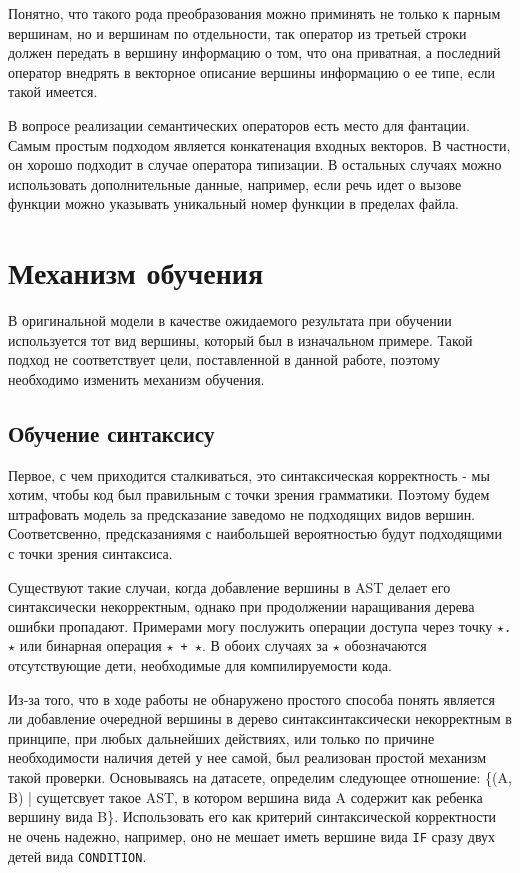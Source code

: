 \documentclass[times,specification,annotation]{itmo-student-thesis}
\begin{document}
Понятно, что такого рода преобразования можно приминять не только к парным вершинам, но и вершинам по отдельности, так оператор из третьей строки должен передать в вершину информацию о том, что она приватная, а последний оператор внедрять в векторное описание вершины информацию о ее типе, если такой имеется.

В вопросе реализации семантических операторов есть место для фантации. Самым простым подходом является конкатенация входных векторов. В частности, он хорошо подходит в случае оператора типизации. В остальных случаях можно использовать дополнительные данные, например, если речь идет о вызове функции можно указывать уникальный номер функции в пределах файла.

\section{Механизм обучения}\label{fit}
В оригинальной модели в качестве ожидаемого результата при обучении используется тот вид вершины, который был в изначальном примере. Такой подход не соответствует цели, поставленной в данной работе, поэтому необходимо изменить механизм обучения.

\subsection{Обучение синтаксису}\label{fit:syntax}
Первое, с чем приходится сталкиваться, это синтаксическая корректность - мы хотим, чтобы код был правильным с точки зрения грамматики. Поэтому будем штрафовать модель за предсказание заведомо не подходящих видов вершин. Соответсвенно, предсказаниямя с наибольшей вероятностью будут подходящими с точки зрения синтаксиса. 

Существуют такие случаи, когда добавление вершины в AST делает его синтаксически некорректным, однако при продолжении наращивания дерева ошибки пропадают. Примерами могу послужить операции доступа через точку \texttt{$\star$.$\star$} или бинарная операция \texttt{$\star$ + $\star$}. В обоих случаях за $\star$ обозначаются отсутствующие дети, необходимые для компилируемости кода.

Из-за того, что в ходе работы не обнаружено простого способа понять является ли добавление очередной вершины в дерево синтаксинтаксически некорректным в принципе, при любых дальнейших действиях, или только по причине необходимости наличия детей у нее самой, был реализован простой механизм такой проверки. Основываясь на датасете, определим следующее отношение: \{(A, B) | сущетсвует такое AST, в котором вершина вида A содержит как ребенка вершину вида B\}. Использовать его как критерий синтаксической корректности не очень надежно, например, оно не мешает иметь вершине вида \texttt{IF} сразу двух детей вида \texttt{CONDITION}.
\end{document}
